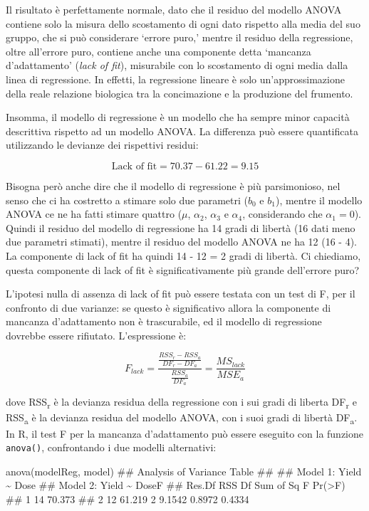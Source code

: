 \documentclass[a4paper,12pt,oneside]{book}
\newenvironment{Shaded}{\begin{snugshade}}{\end{snugshade}}
\newcommand{\DocumentationTok}[1]{#1}
\newcommand{\FunctionTok}[1]{#1}
\newcommand{\NormalTok}[1]{#1}
\begin{document}
Il risultato è perfettamente normale, dato che il residuo del modello ANOVA contiene solo la misura dello scostamento di ogni dato rispetto alla media del suo gruppo, che si può considerare `errore puro,' mentre il residuo della regressione, oltre all'errore puro, contiene anche una componente detta `mancanza d'adattamento' (\emph{lack of fit}), misurabile con lo scostamento di ogni media dalla linea di regressione. In effetti, la regressione lineare è solo un'approssimazione della reale relazione biologica tra la concimazione e la produzione del frumento.

Insomma, il modello di regressione è un modello che ha sempre minor capacità descrittiva rispetto ad un modello ANOVA. La differenza può essere quantificata utilizzando le devianze dei rispettivi residui:

\[\textrm{Lack of fit} = 70.37 - 61.22 = 9.15\]

Bisogna però anche dire che il modello di regressione è più parsimonioso, nel senso che ci ha costretto a stimare solo due parametri (\(b_0\) e \(b_1\)), mentre il modello ANOVA ce ne ha fatti stimare quattro (\(\mu\), \(\alpha_2\), \(\alpha_3\) e \(\alpha_4\), considerando che \(\alpha_1 = 0\)). Quindi il residuo del modello di regressione ha 14 gradi di libertà (16 dati meno due parametri stimati), mentre il residuo del modello ANOVA ne ha 12 (16 - 4). La componente di lack of fit ha quindi 14 - 12 = 2 gradi di libertà. Ci chiediamo, questa componente di lack of fit è significativamente più grande dell'errore puro?

L'ipotesi nulla di assenza di lack of fit può essere testata con un test di F, per il confronto di due varianze: se questo è significativo allora la componente di mancanza d'adattamento non è trascurabile, ed il modello di regressione dovrebbe essere rifiutato. L'espressione è:

\[ F_{lack} = \frac{\frac{RSS_r - RSS_a}{DF_r-DF_a} } {\frac{RSS_a}{DF_a}} = \frac{MS_{lack}}{MSE_a}\]

dove RSS\textsubscript{r} è la devianza residua della regressione con i sui gradi di liberta DF\textsubscript{r} e RSS\textsubscript{a} è la devianza residua del modello ANOVA, con i suoi gradi di libertà DF\textsubscript{a}. In R, il test F per la mancanza d'adattamento può essere eseguito con la funzione \texttt{anova()}, confrontando i due modelli alternativi:

\begin{Shaded}
\begin{Highlighting}[]
\FunctionTok{anova}\NormalTok{(modelReg, model)}
\DocumentationTok{\#\# Analysis of Variance Table}
\DocumentationTok{\#\# }
\DocumentationTok{\#\# Model 1: Yield \textasciitilde{} Dose}
\DocumentationTok{\#\# Model 2: Yield \textasciitilde{} DoseF}
\DocumentationTok{\#\#   Res.Df    RSS Df Sum of Sq      F Pr(\textgreater{}F)}
\DocumentationTok{\#\# 1     14 70.373                           }
\DocumentationTok{\#\# 2     12 61.219  2    9.1542 0.8972 0.4334}
\end{Highlighting}
\end{Shaded}
\end{document}
